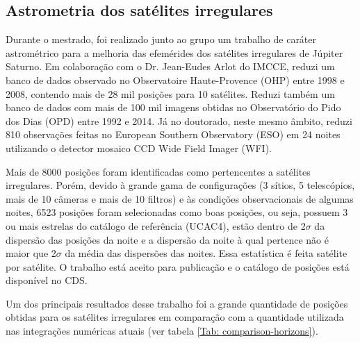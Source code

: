 \documentclass[12pt,a4paper]{monografia}
\begin{document}
\subsection{Astrometria dos sat\'elites irregulares}

\indent \indent Durante o mestrado, foi realizado junto ao grupo um trabalho de caráter astrométrico para a melhoria das efemérides dos satélites irregulares de Júpiter Saturno. Em colaboração com o Dr. Jean-Eudes Arlot do IMCCE, reduzi um banco de dados observado no Observatoire Haute-Provence (OHP) entre 1998 e 2008, contendo mais de 28 mil posições para 10 satélites. Reduzi também um banco de dados com mais de 100 mil imagens obtidas no Observatório do Pido dos Dias (OPD) entre 1992 e 2014. Já no doutorado, neste mesmo âmbito, reduzi 810 observações feitas no European Southern Observatory (ESO) em 24 noites utilizando o detector mosaico CCD Wide Field Imager (WFI).

Mais de 8000 posições foram identificadas como pertencentes a satélites irregulares. Porém, devido à grande gama de configurações (3 sítios, 5 telescópios, mais de 10 câmeras e mais de 10 filtros) e às condições observacionais de algumas noites, 6523 posições foram selecionadas como boas posições, ou seja, possuem 3 ou mais estrelas do catálogo de referência (UCAC4), estão dentro de 2$\sigma$ da dispersão das posições da noite e a dispersão da noite à qual pertence não é maior que 2$\sigma$ da média das dispersões das noites. Essa estatística é feita satélite por satélite. O trabalho está aceito para publicação \citep{GomesJunior2015-Irregular} e o catálogo de posições está disponível no CDS.

Um dos principais resultados desse trabalho foi a grande quantidade de posições obtidas para os satélites irregulares em comparação com a quantidade utilizada nas integrações numéricas atuais (ver tabela \ref{Tab: comparison-horizons}).
\end{document}
